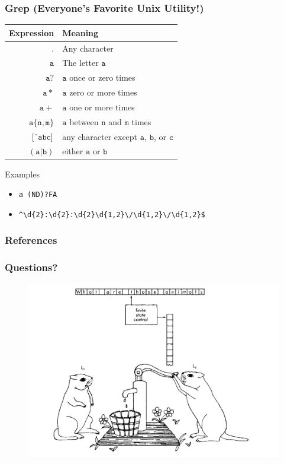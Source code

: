 \documentclass[11 pt]{beamer}
\begin{document}
\begin{frame}[fragile]
	\frametitle{Grep (Everyone's Favorite Unix Utility!)}
	\begin{center}
		{\small
		\begin{tabular}{|r l|}
			\hline
			\textbf{Expression} 	& \textbf{Meaning} \\
			\hline
			$\mathtt{.}$ 					& Any character \\
			$\mathtt{a}$ 					& The letter $\mathtt{a}$ \\
			$\mathtt{a?}$ 					& $\mathtt{a}$ once or zero times \\
			$\mathtt{a*}$ 					& $\mathtt{a}$ zero or more times \\
			$\mathtt{a+}$ 					& $\mathtt{a}$ one or more times \\
			$\mathtt{a \{ n, m \}}$ 		& $\mathtt{a}$ between $\mathtt{n}$ and $\mathtt{m}$ times \\
			$\mathtt{[\char`^{} abc]}$ 		& any character except $\mathtt{a}$, $\mathtt{b}$, or $\mathtt{c}$ \\
			$\mathtt{(a | b)}$ 				& either $\mathtt{a}$ or $\mathtt{b}$ \\
			\hline
		\end{tabular}
		}
	\end{center}
	\begin{block}{Examples}
	\vspace{-3 ex}
		\begin{itemize}
			\item[] \verb!a (ND)?FA!
			\item[] \verb!^\d{2}:\d{2}:\d{2}\d{1,2}\/\d{1,2}\/\d{1,2}$! 
		\end{itemize}
	\end{block}
\end{frame}

\begin{frame}[shrink]
	\frametitle{References}
	
	\nocite{*}
	
\end{frame}


\begin{frame}[fragile]
	\frametitle{Questions?}
	\begin{figure}[H]
		\includegraphics[width = \textwidth]{../images/pumping_lemmings.png}
	\end{figure}
\end{frame}
\end{document}
